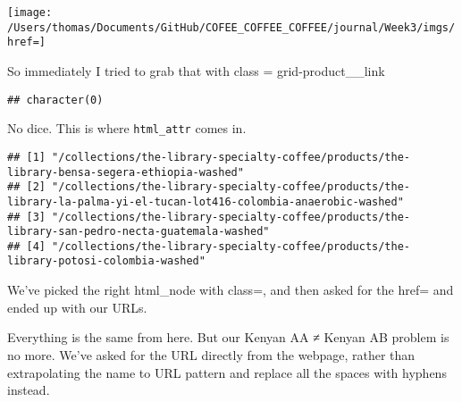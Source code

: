 \documentclass[]{article}
\newenvironment{Shaded}{\begin{snugshade}}{\end{snugshade}}
\newcommand{\KeywordTok}[1]{\textcolor[rgb]{0.13,0.29,0.53}{\textbf{#1}}}
\newcommand{\NormalTok}[1]{#1}
\newcommand{\OperatorTok}[1]{\textcolor[rgb]{0.81,0.36,0.00}{\textbf{#1}}}
\newcommand{\StringTok}[1]{\textcolor[rgb]{0.31,0.60,0.02}{#1}}
\begin{document}
\texttt{[image: /Users/thomas/Documents/GitHub/COFEE\_COFFEE\_COFFEE/journal/Week3/imgs/href=]}

So immediately I tried to grab that with class = grid-product\_\_link

\begin{Shaded}
\end{Shaded}

\begin{verbatim}
## character(0)
\end{verbatim}

No dice. This is where \texttt{html\_attr} comes in.

\begin{Shaded}
\end{Shaded}

\begin{verbatim}
## [1] "/collections/the-library-specialty-coffee/products/the-library-bensa-segera-ethiopia-washed"                         
## [2] "/collections/the-library-specialty-coffee/products/the-library-la-palma-yi-el-tucan-lot416-colombia-anaerobic-washed"
## [3] "/collections/the-library-specialty-coffee/products/the-library-san-pedro-necta-guatemala-washed"                     
## [4] "/collections/the-library-specialty-coffee/products/the-library-potosi-colombia-washed"
\end{verbatim}

We've picked the right html\_node with class=, and then asked for the
href= and ended up with our URLs.

Everything is the same from here. But our Kenyan AA ≠ Kenyan AB problem
is no more. We've asked for the URL directly from the webpage, rather
than extrapolating the name to URL pattern and replace all the spaces
with hyphens instead.
\end{document}
